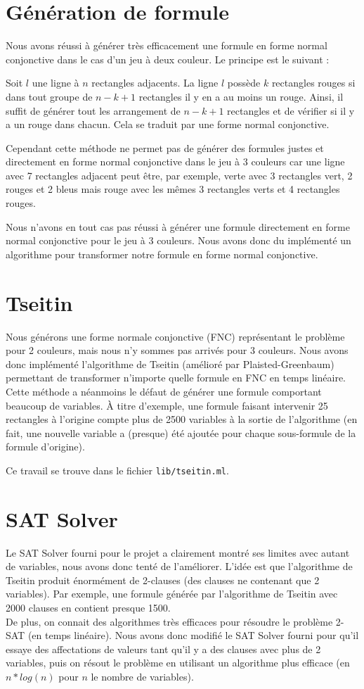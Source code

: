 \documentclass[10pt,a4paper]{article}
\begin{document}
\section{Génération de formule}

Nous avons réussi à générer très efficacement une formule en forme normal conjonctive dans le cas d'un jeu à deux couleur. Le principe est le suivant :

Soit $l$ une ligne à $n$ rectangles adjacents. La ligne $l$ possède $k$ rectangles rouges si dans tout groupe de $n-k+1$ rectangles il y en a au moins un rouge. Ainsi, il suffit de générer tout les arrangement de $n-k+1$ rectangles et de vérifier si il y a un rouge dans chacun. Cela se traduit par une forme normal conjonctive.

Cependant cette méthode ne permet pas de générer des formules justes et directement en forme normal conjonctive dans le jeu à 3 couleurs car une ligne avec 7 rectangles adjacent peut être, par exemple, verte avec 3 rectangles vert, 2 rouges et 2 bleus mais rouge avec les mêmes 3 rectangles verts et 4 rectangles rouges.

Nous n'avons en tout cas pas réussi à générer une formule directement en forme normal conjonctive pour le jeu à 3 couleurs. Nous avons donc du implémenté un algorithme pour transformer notre formule en forme normal conjonctive.


\section{Tseitin}
Nous générons une forme normale conjonctive (FNC) représentant le problème pour 2 couleurs, mais nous n'y sommes pas arrivés pour 3 couleurs. Nous avons donc implémenté l'algorithme de Tseitin (amélioré par Plaisted-Greenbaum) permettant de transformer n'importe quelle formule en FNC en temps linéaire.
Cette méthode a néanmoins le défaut de générer une formule comportant beaucoup de variables. À titre d'exemple, une formule faisant intervenir 25 rectangles à l'origine compte plus de 2500 variables à la sortie de l'algorithme (en fait, une nouvelle variable a (presque) été ajoutée pour chaque sous-formule de la formule d'origine).

Ce travail se trouve dans le fichier \verb|lib/tseitin.ml|.

\section{SAT Solver}
Le SAT Solver fourni pour le projet a clairement montré ses limites avec autant de variables, nous avons donc tenté de l'améliorer. L'idée est que l'algorithme de Tseitin produit énormément de 2-clauses (des clauses ne contenant que 2 variables). Par exemple, une formule générée par l'algorithme de Tseitin avec 2000 clauses en contient presque 1500.\\
De plus, on connait des algorithmes très efficaces pour résoudre le problème 2-SAT (en temps linéaire). Nous avons donc modifié le SAT Solver fourni pour qu'il essaye des affectations de valeurs tant qu'il y a des clauses avec plus de 2 variables, puis on résout le problème en utilisant un algorithme plus efficace (en $n*log(n)$ pour $n$ le nombre de variables).
\end{document}
